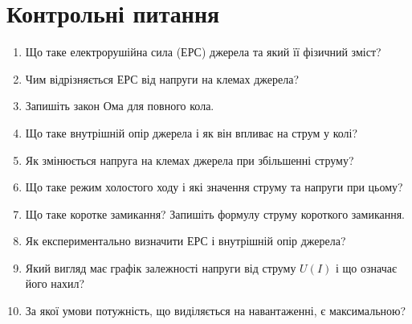 \section*{Контрольні питання}

\begin{enumerate}
    \item Що таке електрорушійна сила (ЕРС) джерела та який її фізичний зміст?

    \item Чим відрізняється ЕРС від напруги на клемах джерела?

    \item Запишіть закон Ома для повного кола.

    \item Що таке внутрішній опір джерела і як він впливає на струм у колі?

    \item Як змінюється напруга на клемах джерела при збільшенні струму?

    \item Що таке режим холостого ходу і які значення струму та напруги при цьому?

    \item Що таке коротке замикання? Запишіть формулу струму короткого замикання.

    \item Як експериментально визначити ЕРС і внутрішній опір джерела?

    \item Який вигляд має графік залежності напруги від струму $U(I)$ і що означає його нахил?

    \item За якої умови потужність, що виділяється на навантаженні, є максимальною?
\end{enumerate}
